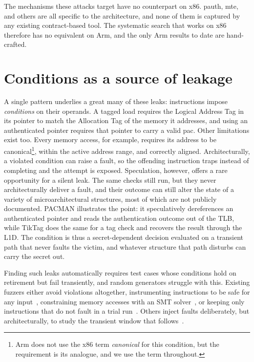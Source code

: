 The mechanisms these attacks target have no counterpart on x86. \gls{pauth}, \gls{mte}, and
others are all specific to the architecture, and none of them is captured by any existing
contract-based tool. The systematic search that works on x86 therefore has no equivalent on
Arm, and the only Arm results to date are hand-crafted.

\section{Conditions as a source of leakage}
\label{sec:intro-precond}

A single pattern underlies a great many of these leaks: instructions impose
\emph{conditions} on their operands. A tagged load requires the Logical Address Tag in its
pointer to match the Allocation Tag of the memory it addresses, and using an authenticated
pointer requires that pointer to carry a valid \gls{pac}. Other limitations exist too. Every memory access, for
example, requires its address to be canonical\footnote{Arm does not use the x86 term
\emph{canonical} for this condition, but the requirement is its analogue, and we use the term
throughout.}, within the active address range, and
correctly aligned. Architecturally, a violated condition can raise a fault, so the
offending instruction traps instead of completing and the attempt is exposed. Speculation,
however, offers a rare opportunity for a silent leak. The same checks still run, but they
never architecturally deliver a fault, and their outcome can still alter the state of a
variety of microarchitectural structures, most of which are not publicly documented. PACMAN
illustrates the point: it speculatively dereferences an authenticated pointer and reads the
authentication outcome out of the TLB, while TikTag does the same for a tag check and recovers
the result through the L1D. The condition is thus a secret-dependent decision evaluated on a
transient path that never faults the victim, and whatever structure that path disturbs can
carry the secret out.

Finding such leaks automatically requires test cases whose conditions hold on retirement but
fail transiently, and random generators struggle with this. Existing fuzzers either avoid
violations altogether, instrumenting instructions to be safe for any
input~\cite{revizor,hide_seek}, constraining memory accesses with an SMT solver~\cite{scamv}, or
keeping only instructions that do not fault in a trial run~\cite{osiris}. Others inject faults
deliberately, but architecturally, to study the transient window that
follows~\cite{speculation_fault,isolation,transynther}.

